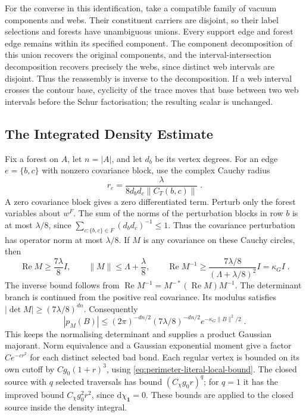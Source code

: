 \documentclass[11pt]{article}
\newcommand{\dd}{\mathrm{d}}
\newcommand{\id}{\mathbf 1}
\begin{document}
For the converse in this identification, take a compatible family of vacuum components and webs. Their constituent carriers are disjoint, so their label selections and forests have unambiguous unions. Every support edge and forest edge remains within its specified component. The component decomposition of this union recovers the original components, and the interval-intersection decomposition recovers precisely the webs, since distinct web intervals are disjoint. Thus the reassembly is inverse to the decomposition. If a web interval crosses the contour base, cyclicity of the trace moves that base between two web intervals before the Schur factorisation; the resulting scalar is unchanged.

\subsection{The Integrated Density Estimate}

Fix a forest on $A$, let $n=|A|$, and let $d_b$ be its vertex degrees. For an edge $e=\{b,c\}$ with nonzero covariance block, use the complex Cauchy radius
\begin{equation}\label{eq:marginal-edge-radius}
    r_e=\frac{\lambda}{8d_bd_c\|C_T(b,c)\|}\;.
\end{equation}
A zero covariance block gives a zero differentiated term. Perturb only the forest variables about $w^F$. The sum of the norms of the perturbation blocks in row $b$ is at most $\lambda/8$, since $\sum_{c:\{b,c\}\in F}(d_bd_c)^{-1}\leq 1$. Thus the covariance perturbation has operator norm at most $\lambda/8$. If $M$ is any covariance on these Cauchy circles, then
\begin{equation}\label{eq:marginal-complex-density}
    \operatorname{Re}M\geq \frac{7\lambda}{8}I,
    \qquad \|M\|\leq \Lambda+\frac{\lambda}{8},
    \qquad
    \operatorname{Re}M^{-1}\geq
        \frac{7\lambda/8}{(\Lambda+\lambda/8)^2}I=\kappa_G I\;.
\end{equation}
The inverse bound follows from $\operatorname{Re}M^{-1}=M^{-*}(\operatorname{Re}M)M^{-1}$. The determinant branch is continued from the positive real covariance. Its modulus satisfies $|\det M|\geq (7\lambda/8)^{d n}$. Consequently
\begin{equation}\label{eq:marginal-density-majorant}
    |p_M(B)|\leq
        (2\pi)^{-dn/2}(7\lambda/8)^{-dn/2}
            e^{-\kappa_G\|B\|^2/2}\;.
\end{equation}
This keeps the normalising determinant and supplies a product Gaussian majorant. Norm equivalence and a Gaussian exponential moment give a factor $C e^{-c r^2}$ for each distinct selected bad bond. Each regular vertex is bounded on its own cutoff by $C g_0(1+r)^3$, using \eqref{eq:perimeter-literal-local-bound}. The closed source with $q$ selected traversals has bound $(C_\chi g_0r)^q$; for $q=1$ it has the improved bound $C_\chi g_0^2r^2$, since $\dd\chi_{\id}=0$. These bounds are applied to the closed source inside the density integral.
\end{document}

